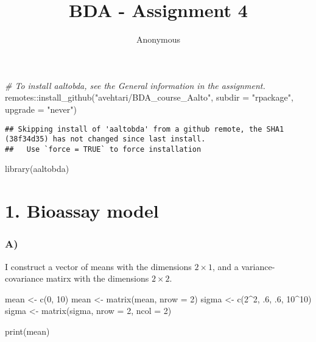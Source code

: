 \documentclass[
]{article}
\title{BDA - Assignment 4}
\author{Anonymous}
\date{}
\newenvironment{Shaded}{\begin{snugshade}}{\end{snugshade}}
\newcommand{\AttributeTok}[1]{\textcolor[rgb]{0.77,0.63,0.00}{#1}}
\newcommand{\CommentTok}[1]{\textcolor[rgb]{0.56,0.35,0.01}{\textit{#1}}}
\newcommand{\DecValTok}[1]{\textcolor[rgb]{0.00,0.00,0.81}{#1}}
\newcommand{\FunctionTok}[1]{\textcolor[rgb]{0.00,0.00,0.00}{#1}}
\newcommand{\NormalTok}[1]{#1}
\newcommand{\OtherTok}[1]{\textcolor[rgb]{0.56,0.35,0.01}{#1}}
\newcommand{\SpecialCharTok}[1]{\textcolor[rgb]{0.00,0.00,0.00}{#1}}
\newcommand{\StringTok}[1]{\textcolor[rgb]{0.31,0.60,0.02}{#1}}
\begin{document}
\maketitle

{
\hypersetup{linkcolor=}
\setcounter{tocdepth}{1}
\tableofcontents
}
\begin{Shaded}
\begin{Highlighting}[]
\CommentTok{\# To install aaltobda, see the General information in the assignment.}
\NormalTok{remotes}\SpecialCharTok{::}\FunctionTok{install\_github}\NormalTok{(}\StringTok{"avehtari/BDA\_course\_Aalto"}\NormalTok{, }\AttributeTok{subdir =} \StringTok{"rpackage"}\NormalTok{, }\AttributeTok{upgrade =} \StringTok{"never"}\NormalTok{)}
\end{Highlighting}
\end{Shaded}

\begin{verbatim}
## Skipping install of 'aaltobda' from a github remote, the SHA1 (38f34d35) has not changed since last install.
##   Use `force = TRUE` to force installation
\end{verbatim}

\begin{Shaded}
\begin{Highlighting}[]
\FunctionTok{library}\NormalTok{(aaltobda)}
\end{Highlighting}
\end{Shaded}

\hypertarget{bioassay-model}{%
\section{1. Bioassay model}\label{bioassay-model}}

\hypertarget{a}{%
\subsubsection{A)}\label{a}}

I construct a vector of means with the dimensions \(2 \times 1\), and a
variance-covariance matirx with the dimensions \(2 \times 2\).

\begin{Shaded}
\begin{Highlighting}[]
\NormalTok{mean  }\OtherTok{\textless{}{-}} \FunctionTok{c}\NormalTok{(}\DecValTok{0}\NormalTok{, }\DecValTok{10}\NormalTok{)}
\NormalTok{mean  }\OtherTok{\textless{}{-}} \FunctionTok{matrix}\NormalTok{(mean, }\AttributeTok{nrow =} \DecValTok{2}\NormalTok{)}
\NormalTok{sigma }\OtherTok{\textless{}{-}} \FunctionTok{c}\NormalTok{(}\DecValTok{2}\SpecialCharTok{\^{}}\DecValTok{2}\NormalTok{, .}\DecValTok{6}\NormalTok{, .}\DecValTok{6}\NormalTok{, }\DecValTok{10}\SpecialCharTok{\^{}}\DecValTok{10}\NormalTok{)}
\NormalTok{sigma }\OtherTok{\textless{}{-}} \FunctionTok{matrix}\NormalTok{(sigma, }\AttributeTok{nrow =} \DecValTok{2}\NormalTok{, }\AttributeTok{ncol =} \DecValTok{2}\NormalTok{)}

\FunctionTok{print}\NormalTok{(mean)}
\end{Highlighting}
\end{Shaded}
\end{document}
